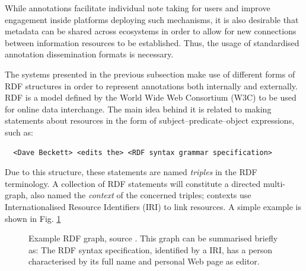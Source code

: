 
While annotations facilitate individual note taking for users and improve
engagement inside platforms deploying such mechanisms, it is also desirable
that metadata can be shared across ecosystems in order to allow for new
connections between information resources to be established. Thus, the usage of
standardised annotation dissemination formats is necessary.

The systems presented in the previous subsection make use of different forms of
RDF structures in order to represent annotations both internally and
externally.  RDF \cite{ref:rdf} is a model defined by the World Wide Web
Consortium (W3C) to be used for online data interchange. The main idea behind
it is related to making statements about resources in the form of
subject--predicate--object expressions, such as:

\begin{verbatim}
  <Dave Beckett> <edits the> <RDF syntax grammar specification>
\end{verbatim}

Due to this structure, these statements are named \textit{triples} in the RDF
terminology.  A collection of RDF statements will constitute a directed
multi-graph, also named the \textit{context} of the concerned triples; contexts
use Internationalised Resource Identifiers (IRI) to link resources. A simple
example is shown in Fig. \ref{fig:rdf}

\begin{figure}[!ht]
  \centering
  \caption[Example RDF graph]
          {Example RDF graph, source \cite{ref:rdfsyntax}. This graph
           can be summarised briefly as: The RDF syntax specification,
           identified by a IRI, has a person characterised by its full name and
           personal Web page as editor.}
  \label{fig:rdf}
\end{figure}

